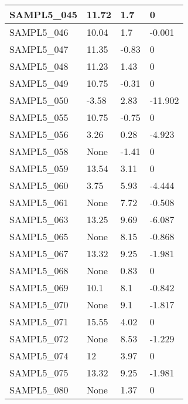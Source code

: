\documentclass{article}
\begin{document}
\begin{table}[]
\begin{tabular}{|l|l|l|l|}
SAMPL5\_045 & 11.72          & 1.7           & 0                \\ \hline
SAMPL5\_046 & 10.04          & 1.7           & -0.001           \\ \hline
SAMPL5\_047 & 11.35          & -0.83         & 0                \\ \hline
SAMPL5\_048 & 11.23          & 1.43          & 0                \\ \hline
SAMPL5\_049 & 10.75          & -0.31         & 0                \\ \hline
SAMPL5\_050 & -3.58          & 2.83          & -11.902          \\ \hline
SAMPL5\_055 & 10.75          & -0.75         & 0                \\ \hline
SAMPL5\_056 & 3.26           & 0.28          & -4.923           \\ \hline
SAMPL5\_058 & None           & -1.41         & 0                \\ \hline
SAMPL5\_059 & 13.54          & 3.11          & 0                \\ \hline
SAMPL5\_060 & 3.75           & 5.93          & -4.444           \\ \hline
SAMPL5\_061 & None           & 7.72          & -0.508           \\ \hline
SAMPL5\_063 & 13.25          & 9.69          & -6.087           \\ \hline
SAMPL5\_065 & None           & 8.15          & -0.868           \\ \hline
SAMPL5\_067 & 13.32          & 9.25          & -1.981           \\ \hline
SAMPL5\_068 & None           & 0.83          & 0                \\ \hline
SAMPL5\_069 & 10.1           & 8.1           & -0.842           \\ \hline
SAMPL5\_070 & None           & 9.1           & -1.817           \\ \hline
SAMPL5\_071 & 15.55          & 4.02          & 0                \\ \hline
SAMPL5\_072 & None           & 8.53          & -1.229           \\ \hline
SAMPL5\_074 & 12             & 3.97          & 0                \\ \hline
SAMPL5\_075 & 13.32          & 9.25          & -1.981           \\ \hline
SAMPL5\_080 & None           & 1.37          & 0                \\ \hline

\end{tabular}
\end{table}
\end{document}

